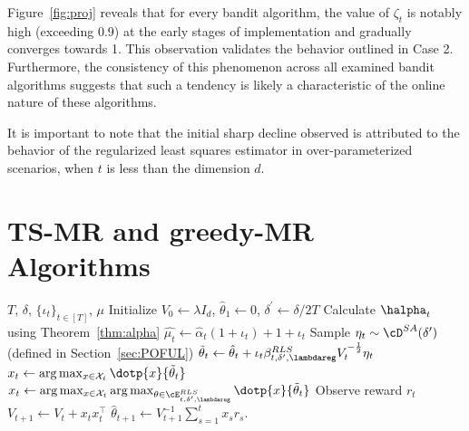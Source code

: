 Figure~\ref{fig:proj} reveals that for every bandit algorithm, the value of $\zeta_t$ is notably high (exceeding 0.9) at the early stages of implementation and gradually converges towards 1. This observation validates the behavior outlined in Case 2. Furthermore, the consistency of this phenomenon across all examined bandit algorithms suggests that such a tendency is likely a characteristic of the online nature of these algorithms.

It is important to note that the initial sharp decline observed is attributed to the behavior of the regularized least squares estimator in over-parameterized scenarios, when $t$ is less than the dimension $d$.

\newpage
\section{TS-MR and greedy-MR Algorithms}
\label{sec:TS-MR}
\begin{algorithm}[!htp]
	\caption{TS-MR (Greedy-MR)}\label{alg:TS-MR}
	\begin{algorithmic}
		\REQUIRE $T$, $\delta$,  $\{\iota_t\}_{t\in [T]}$, $\mu$	
		\STATE Initialize $ V_{0} \leftarrow \lambda I_d$,  $\hat{\theta}_{1} \leftarrow 0$, $\delta^\prime \leftarrow \delta/2T$
		\STATE Calculate $\halpha_t$ using Theorem~\ref{thm:alpha}
		\STATE $\hat{\mu_t} \leftarrow  \hat{\alpha}_t(1+\iota_t )+1+\iota_t$ 
		\STATE Sample $\eta_t\sim \cD^{SA}(\delta^\prime)$ (defined in Section~\ref{sec:POFUL})
		\STATE $\tilde{\theta}_{t}  \leftarrow \hat{\theta}_t +\iota_t \beta_{t,\delta^\prime, \lambdareg}^{RLS} V_t^{-\frac{1}{2}} \eta_t$
		\STATE ${x}_{t} \leftarrow \arg \max _{x \in \mathcal{X}_t}\dotp{ x}{ \tilde{\theta}_{t}}$
		\ELSE
		\STATE   ${x}_{t} \leftarrow \arg \max _{x \in \mathcal{X}_t} \arg \max _{\theta \in \cE_{t,\delta^\prime, \lambdareg}^{RLS} }\dotp{ x}{ \tilde{\theta}_{t}}$
		\ENDIF
		\STATE Observe reward $r_{t}$
		\STATE $V_{t+1} \leftarrow V_{t}+{x}_{t}  {x}_{t}^{\top}$
		\STATE $\hat{\theta}_{t+1} \leftarrow V_{t+1}^{-1}\sum_{s=1}^{t} x_s r_{s}$.
		\ENDFOR
	\end{algorithmic}
\end{algorithm}





